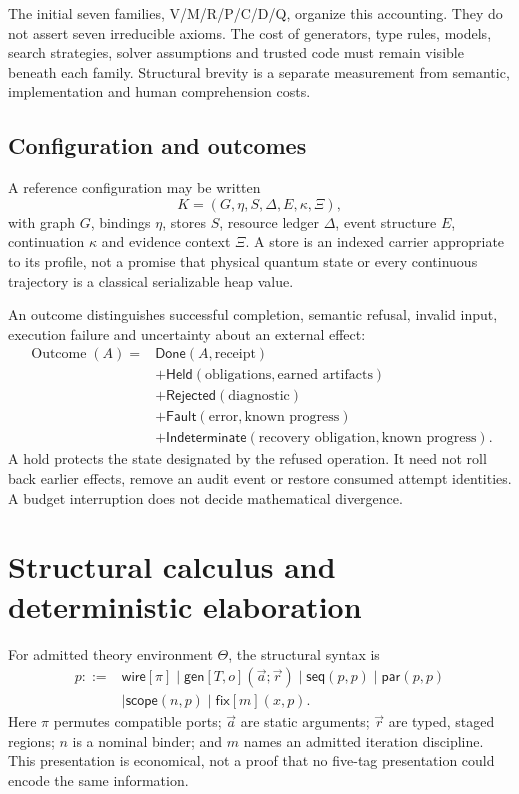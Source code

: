 \documentclass[11pt]{article}
\theoremstyle{remark}
\newcommand{\hold}{\mathsf{Held}}
\newcommand{\done}{\mathsf{Done}}
\newcommand{\gen}{\mathsf{gen}}
\newcommand{\seq}{\mathsf{seq}}
\newcommand{\parop}{\mathsf{par}}
\newcommand{\wire}{\mathsf{wire}}
\newcommand{\scope}{\mathsf{scope}}
\newcommand{\fix}{\mathsf{fix}}
\begin{document}
The initial seven families, V/M/R/P/C/D/Q, organize this accounting. They do
not assert seven irreducible axioms. The cost of generators, type rules,
models, search strategies, solver assumptions and trusted code must remain
visible beneath each family. Structural brevity is a separate measurement
from semantic, implementation and human comprehension costs.

\subsection{Configuration and outcomes}

A reference configuration may be written
\[
 K=(G,\eta,S,\Delta,E,\kappa,\Xi),
\]
with graph $G$, bindings $\eta$, stores $S$, resource ledger $\Delta$,
event structure $E$, continuation $\kappa$ and evidence context $\Xi$.
A store is an indexed carrier appropriate to its profile, not a promise
that physical quantum state or every continuous trajectory is a classical
serializable heap value.

An outcome distinguishes successful completion, semantic refusal, invalid
input, execution failure and uncertainty about an external effect:
\begin{align*}
\operatorname{Outcome}(A)={}&\done(A,\text{receipt})\\
 &+\hold(\text{obligations},\text{earned artifacts})\\
 &+\mathsf{Rejected}(\text{diagnostic})\\
 &+\mathsf{Fault}(\text{error},\text{known progress})\\
 &+\mathsf{Indeterminate}(\text{recovery obligation},\text{known progress}).
\end{align*}
A hold protects the state designated by the refused operation. It need not
roll back earlier effects, remove an audit event or restore consumed attempt
identities. A budget interruption does not decide mathematical divergence.

\section{Structural calculus and deterministic elaboration}
\label{sec:structure}

For admitted theory environment $\Theta$, the structural syntax is
\begin{align*}
p ::= {}&\wire[\pi]\mid\gen[T,o](\vec a;\vec r)
 \mid\seq(p,p)\mid\parop(p,p)\\
 &\mid\scope(n,p)\mid\fix[m](x,p).
\end{align*}
Here $\pi$ permutes compatible ports; $\vec a$ are static arguments;
$\vec r$ are typed, staged regions; $n$ is a nominal binder; and $m$ names
an admitted iteration discipline. This presentation is economical, not a
proof that no five-tag presentation could encode the same information.
\end{document}
